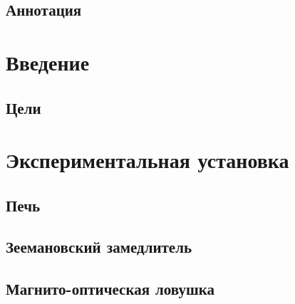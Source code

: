 


\subsection*{Аннотация}



\newpage
\section{Введение}

\subsection{Цели}





\newpage
\section{Экспериментальная установка}

\subsection{Печь}



\newpage
\subsection{Зеемановский замедлитель}



\newpage
\subsection{Магнито-оптическая ловушка}





\newpage


